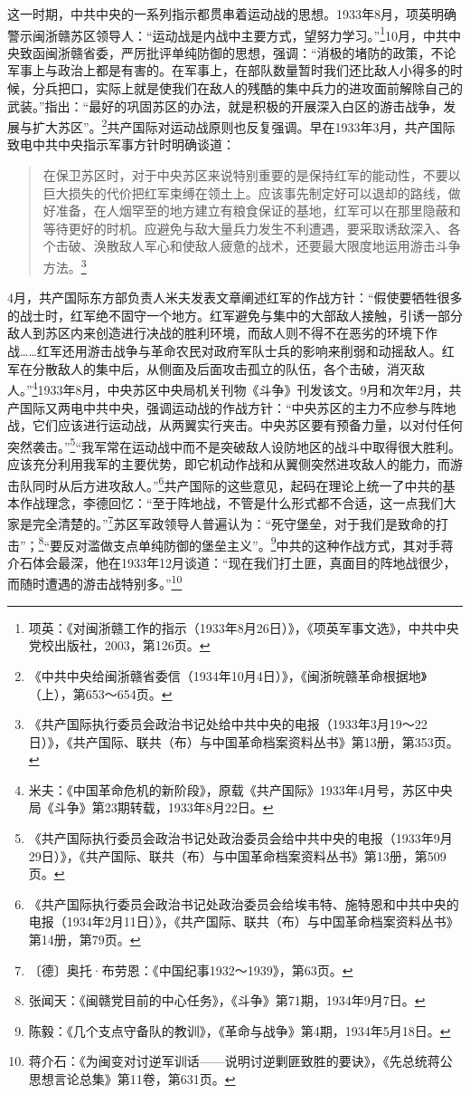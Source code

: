 这一时期，中共中央的一系列指示都贯串着运动战的思想。1933年8月，项英明确警示闽浙赣苏区领导人：“运动战是内战中主要方式，望努力学习。”\footnote{项英：《对闽浙赣工作的指示（1933年8月26日）》，《项英军事文选》，中共中央党校出版社，2003，第126页。}10月，中共中央致函闽浙赣省委，严厉批评单纯防御的思想，强调：“消极的堵防的政策，不论军事上与政治上都是有害的。在军事上，在部队数量暂时我们还比敌人小得多的时候，分兵把口，实际上就是使我们在敌人的残酷的集中兵力的进攻面前解除自己的武装。”指出：“最好的巩固苏区的办法，就是积极的开展深入白区的游击战争，发展与扩大苏区”。\footnote{《中共中央给闽浙赣省委信（1934年10月4日）》，《闽浙皖赣革命根据地》（上），第653～654页。}共产国际对运动战原则也反复强调。早在1933年3月，共产国际致电中共中央指示军事方针时明确谈道：

\begin{quote}

在保卫苏区时，对于中央苏区来说特别重要的是保持红军的能动性，不要以巨大损失的代价把红军束缚在领土上。应该事先制定好可以退却的路线，做好准备，在人烟罕至的地方建立有粮食保证的基地，红军可以在那里隐蔽和等待更好的时机。应避免与敌大量兵力发生不利遭遇，要采取诱敌深入、各个击破、涣散敌人军心和使敌人疲惫的战术，还要最大限度地运用游击斗争方法。\footnote{《共产国际执行委员会政治书记处给中共中央的电报（1933年3月19～22日）》，《共产国际、联共（布）与中国革命档案资料丛书》第13册，第353页。}
\end{quote}


4月，共产国际东方部负责人米夫发表文章阐述红军的作战方针：“假使要牺牲很多的战士时，红军绝不固守一个地方。红军避免与集中的大部敌人接触，引诱一部分敌人到苏区内来创造进行决战的胜利环境，而敌人则不得不在恶劣的环境下作战……红军还用游击战争与革命农民对政府军队士兵的影响来削弱和动摇敌人。红军在分散敌人的集中后，从侧面及后面攻击孤立的队伍，各个击破，消灭敌人。”\footnote{米夫：《中国革命危机的新阶段》，原载《共产国际》1933年4月号，苏区中央局《斗争》第23期转载，1933年8月22日。}1933年8月，中央苏区中央局机关刊物《斗争》刊发该文。9月和次年2月，共产国际又两电中共中央，强调运动战的作战方针：“中央苏区的主力不应参与阵地战，它们应该进行运动战，从两翼实行夹击。中央苏区要有预备力量，以对付任何突然袭击。”\footnote{《共产国际执行委员会政治书记处政治委员会给中共中央的电报（1933年9月29日）》，《共产国际、联共（布）与中国革命档案资料丛书》第13册，第509页。}“我军常在运动战中而不是突破敌人设防地区的战斗中取得很大胜利。应该充分利用我军的主要优势，即它机动作战和从翼侧突然进攻敌人的能力，而游击队同时从后方进攻敌人。”\footnote{《共产国际执行委员会政治书记处政治委员会给埃韦特、施特恩和中共中央的电报（1934年2月11日）》，《共产国际、联共（布）与中国革命档案资料丛书》第14册，第79页。}共产国际的这些意见，起码在理论上统一了中共的基本作战理念，李德回忆：“至于阵地战，不管是什么形式都不合适，这一点我们大家是完全清楚的。”\footnote{〔德〕奥托·布劳恩：《中国纪事1932～1939》，第63页。}苏区军政领导人普遍认为：“死守堡垒，对于我们是致命的打击”；\footnote{张闻天：《闽赣党目前的中心任务》，《斗争》第71期，1934年9月7日。}“要反对滥做支点单纯防御的堡垒主义”。\footnote{陈毅：《几个支点守备队的教训》，《革命与战争》第4期，1934年5月18日。}中共的这种作战方式，其对手蒋介石体会最深，他在1933年12月谈道：“现在我们打土匪，真面目的阵地战很少，而随时遭遇的游击战特别多。”\footnote{蒋介石：《为闽变对讨逆军训话——说明讨逆剿匪致胜的要诀》，《先总统蒋公思想言论总集》第11卷，第631页。}


